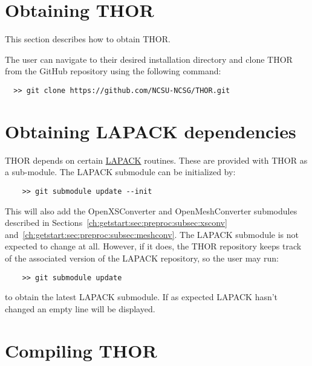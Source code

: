 \section{Obtaining THOR}

This section describes how to obtain \ac{THOR}.

The user can navigate to their desired installation directory and clone \ac{THOR} from the GitHub repository using the following command:
\begin{verbatim}
  >> git clone https://github.com/NCSU-NCSG/THOR.git
\end{verbatim}

\section{Obtaining LAPACK dependencies}

\ac{THOR} depends on certain \href{http://www.netlib.org/lapack/}{\ac{LAPACK}} routines.
These are provided with \ac{THOR} as a sub-module.
The \ac{LAPACK} submodule can be initialized by:
\begin{verbatim}
    >> git submodule update --init
\end{verbatim}
This will also add the OpenXSConverter and OpenMeshConverter submodules described in Sections~\ref{ch:getstart:sec:preproc:subsec:xsconv} and~\ref{ch:getstart:sec:preproc:subsec:meshconv}.
The \ac{LAPACK} submodule is not expected to change at all.
However, if it does, the \ac{THOR} repository keeps track of the associated version of the \ac{LAPACK} repository, so the user may run:
\begin{verbatim}
    >> git submodule update
\end{verbatim}
to obtain the latest \ac{LAPACK} submodule.
If as expected \ac{LAPACK} hasn't changed an empty line will be displayed.

\section{Compiling THOR}

